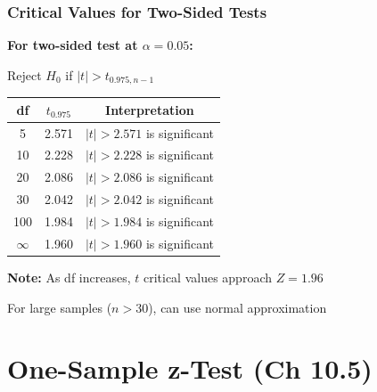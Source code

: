 \documentclass{beamer}
\begin{document}
\begin{frame}
\frametitle{Critical Values for Two-Sided Tests}
\textbf{For two-sided test at $\alpha = 0.05$:}

\vspace{0.3cm}
Reject $H_0$ if $|t| > t_{0.975, n-1}$

\vspace{0.5cm}
\begin{center}
\begin{tabular}{ccc}
\toprule
df & $t_{0.975}$ & Interpretation \\
\midrule
5 & 2.571 & $|t| > 2.571$ is significant \\
10 & 2.228 & $|t| > 2.228$ is significant \\
20 & 2.086 & $|t| > 2.086$ is significant \\
30 & 2.042 & $|t| > 2.042$ is significant \\
100 & 1.984 & $|t| > 1.984$ is significant \\
$\infty$ & 1.960 & $|t| > 1.960$ is significant \\
\bottomrule
\end{tabular}
\end{center}

\vspace{0.5cm}
\textbf{Note:} As df increases, $t$ critical values approach $Z = 1.96$

\vspace{0.3cm}
For large samples ($n > 30$), can use normal approximation
\end{frame}

\section{One-Sample z-Test (Ch 10.5)}
\end{document}
